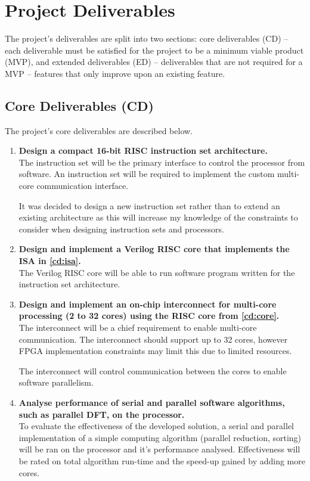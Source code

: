 \documentclass[11pt,a4paper]{report}
\begin{document}
{\section{Project Deliverables}
\label{sect:goals}
The project's deliverables are split into two sections: core deliverables (CD) -- each deliverable must be satisfied for the project to be a minimum viable product (MVP), and extended deliverables (ED) -- deliverables that are not required for a MVP -- features that only improve upon an existing feature.

\subsection{Core Deliverables (CD)}
The project's core deliverables are described below.
\begin{enumerate}[leftmargin=2\parindent, label=\bfseries CD\arabic*]
\item{\textbf{Design a compact 16-bit RISC instruction set architecture.}\\
The instruction set will be the primary interface to control the processor from software. An instruction set will be required to implement the custom multi-core communication interface.

It was decided to design a new instruction set rather than to extend an existing architecture as this will increase my knowledge of the constraints to consider when designing instruction sets and processors.
}
\label{cd:isa}

\item{\textbf{Design and implement a Verilog RISC core that implements the ISA in \ref{cd:isa}.}\\
The Verilog RISC core will be able to run software program written for the instruction set architecture.
}\label{cd:core}

\item{\textbf{Design and implement an on-chip interconnect for multi-core processing (2 to 32 cores) using the RISC core from \ref{cd:core}.}\\
The interconnect will be a chief requirement to enable multi-core communication. The interconnect should support up to 32 cores, however FPGA implementation constraints may limit this due to limited resources.

The interconnect will control communication between the cores to enable software parallelism.
}\label{cd:interconnect}

\item{\textbf{Analyse performance of serial and parallel software algorithms, such as parallel DFT, on the processor.}\\
To evaluate the effectiveness of the developed solution, a serial and parallel implementation of a simple computing algorithm (parallel reduction, sorting) will be ran on the processor and it's performance analysed. Effectiveness will be rated on total algorithm run-time and the speed-up gained by adding more cores.
}\label{cd:software}


\end{enumerate}}
\end{document}

